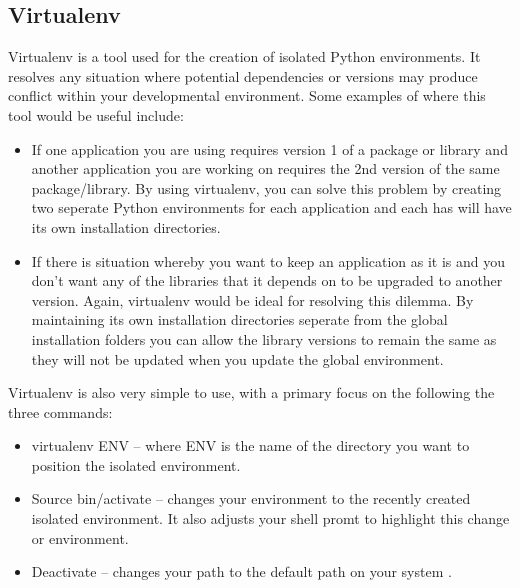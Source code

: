 \subsection{Virtualenv}
Virtualenv is a tool used for the creation of isolated Python environments. It resolves any situation where potential dependencies or versions may produce conflict within your developmental environment. Some examples of where this tool would be useful include:
\begin{itemize}
	\item If one application you are using requires version 1 of a package or library and another application you are working on requires the 2nd version of the same package/library. By using virtualenv, you can solve this problem by creating two seperate Python environments for each application and each has will have its own installation directories.
	\item If there is situation whereby you want to keep an application as it is and you don’t want any of the libraries that it depends on to be upgraded to another version. Again, virtualenv would be ideal for resolving this dilemma. By maintaining its own installation directories seperate from the global installation folders you can allow the library versions to remain the same as they will not be updated when you update the global environment. 
\end{itemize}
Virtualenv is also very simple to use, with a primary focus on the following the three commands:
\begin{itemize}
	\item virtualenv ENV – where ENV is the name of the directory you want to position the isolated environment.
	\item Source bin/activate – changes your environment to the recently created isolated environment. It also adjusts your shell promt to highlight this change or environment.
	\item Deactivate – changes your path to the default path on your system \cite{virtualenv}.
\end{itemize}
